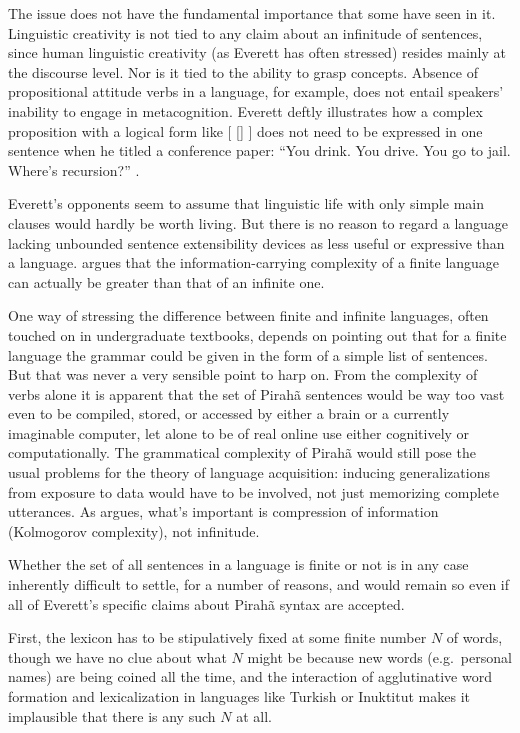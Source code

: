 \documentclass[output=paper,colorlinks,citecolor=brown
]{langscibook}
\begin{document}
The issue does not have the fundamental importance that some have seen
in it. Linguistic creativity is not tied to any claim about an infinitude
of sentences, since human linguistic creativity (as Everett has often
stressed) resides mainly at the discourse level.
Nor is it tied to the ability to grasp concepts.
Absence of propositional attitude verbs in a language, for example,
does not entail speakers' inability to engage in metacognition.
Everett deftly illustrates how a complex proposition with a logical
form like [ [] ]  does not need
to be expressed in one sentence when he titled a conference paper:
``You drink. You drive. You go to jail. Where's recursion?''
\citep{Everett10}.

Everett's opponents seem to assume that linguistic life with only
simple main clauses would hardly be worth living.
But there is no reason to regard a language lacking unbounded sentence
extensibility devices as less useful or expressive than a language.
\citet{Kornai14} argues that the information-carrying complexity of
a finite language can actually be greater than that of an infinite one.

One way of stressing the difference between finite and infinite languages,
often touched on in undergraduate textbooks, depends on pointing out that
for a finite language the grammar could be given in the form of a simple
list of sentences. But that was never a very sensible point to harp on.
From the complexity of verbs alone \citep[288--301]{Everett86HAL}
it is apparent that the set of Pirah{\~a} sentences would be way too vast
even to be compiled, stored, or accessed by either a brain or a currently
imaginable computer, let alone to be of real online use either cognitively
or computationally. The grammatical complexity of Pirah{\~a} would still
pose the usual problems for the theory of language acquisition: inducing
generalizations from exposure to data would have to be involved, not just
memorizing complete utterances. As  argues, what's
important is compression of information (Kolmogorov complexity), not
infinitude.

Whether the set of all sentences in a language is finite or not is
in any case inherently difficult to settle, for a number of reasons,
and would remain so even if all of Everett's specific claims about
Pirah{\~a} syntax are accepted.

First, the lexicon has to be stipulatively fixed at some finite number
$N$ of words, though we have no clue about what $N$ might be because
new words (e.g.\ personal names) are being coined all the time, and
the interaction of agglutinative word formation and lexicalization
in languages like Turkish or Inuktitut makes it implausible that there
is any such $N$ at all.
\end{document}
